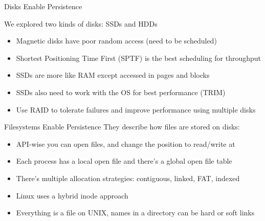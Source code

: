   \begin{frame}{Disks Enable Persistence}

    We explored two kinds of disks: SSDs and HDDs
    \begin{itemize}
      \item Magnetic disks have poor random access (need to be scheduled)
      \item Shortest Positioning Time First (SPTF) is the best scheduling for throughput
      \item SSDs are more like RAM except accessed in pages and blocks
      \item SSDs also need to work with the OS for best performance (TRIM)
      \item Use RAID to tolerate failures and improve performance using multiple disks
    \end{itemize}
  \end{frame}

  \begin{frame}{Filesystems Enable Persistence}
    They describe how files are stored on disks:
    \begin{itemize}
      \item API-wise you can open files, and change the position to read/write
            at
      \item Each process has a local open file and there's a global open file
            table
      \item There's multiple allocation strategies: contiguous, linked, FAT, indexed
      \item Linux uses a hybrid inode approach
      \item Everything is a file on UNIX, names in a directory can be hard or soft links
      
    \end{itemize}
  \end{frame}

